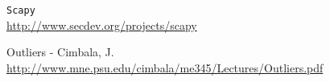 \documentclass[%
	final, %
	notitlepage,
	narroweqnarray,
	inline,
	twoside,
	]{ieee}
\begin{document}
\begin{thebibliography}{1}






\texttt{Scapy}\\
\url{http://www.secdev.org/projects/scapy}

Outliers - Cimbala, J. \\
\url{http://www.mne.psu.edu/cimbala/me345/Lectures/Outliers.pdf}



\end{thebibliography}
\end{document}
